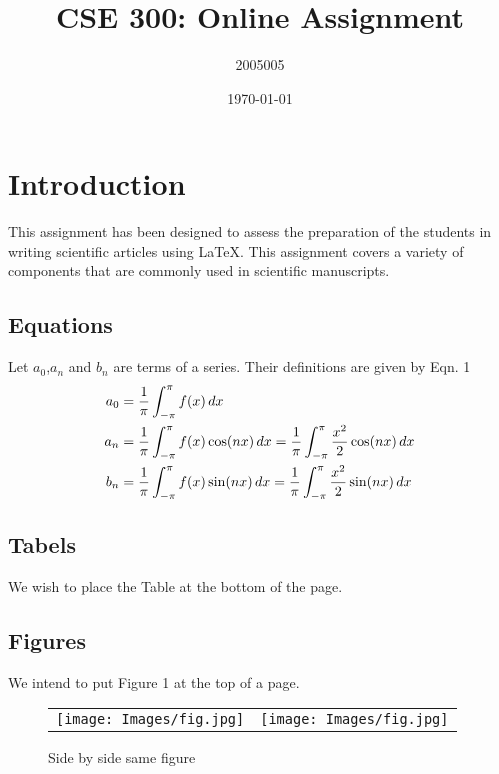 \documentclass[20pt]{article}
\title{CSE 300: Online Assignment}
\author{2005005}
\date{\today}
\begin{document}
\maketitle

\section{Introduction}
This assignment has been designed to assess the preparation of the students
in writing scientific articles using \LaTeX. This assignment covers a variety of
components that are commonly used in scientific manuscripts.
\subsection{Equations}
 Let $a_0$,$a_n$ and $b_n$ are terms of a series. Their definitions are given by Eqn. 1\\
 \begin{align}
a_0 &= \frac{1}{\pi} \int_{-\pi}^{\pi} f(x) \,dx \notag \\
a_n &= \frac{1}{\pi} \int_{-\pi}^{\pi} f(x) \cos(nx) \,dx = \frac{1}{\pi} \int_{-\pi}^{\pi} \frac{x^2}{2} \cos(nx) \,dx \notag \\
b_n &= \frac{1}{\pi} \int_{-\pi}^{\pi} f(x) \sin(nx) \,dx = \frac{1}{\pi} \int_{-\pi}^{\pi} \frac{x^2}{2} \sin(nx) \,dx
\end{align}
\subsection{Tabels}
We wish to place the Table at the bottom of the page.
\subsection{Figures}
We intend to put Figure 1 at the top of a page.
\pagebreak
\begin{figure}[h]
    \centering
    \begin{tabular}{c c}
        \texttt{[image: Images/fig.jpg]} & \texttt{[image: Images/fig.jpg]}  \\
    \end{tabular}
    \caption{Side by side same figure}
    \label{fig:enter-label}
\end{figure}
\end{document}
